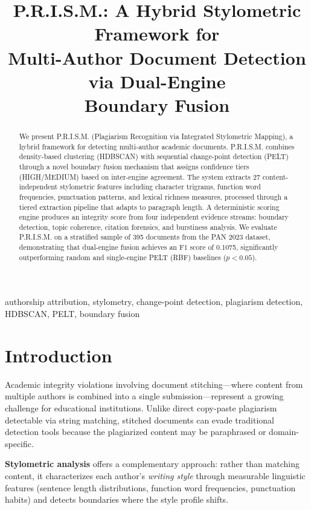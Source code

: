 \documentclass[conference]{IEEEtran}
\title{P.R.I.S.M.: A Hybrid Stylometric Framework for\\Multi-Author Document Detection via Dual-Engine\\Boundary Fusion}
\author{
    \IEEEauthorblockN{Harshal Andhale}
    \IEEEauthorblockA{Department of Computer Science\\
    \textit{Affiliation}\\
    harshal@example.com}
}
\begin{document}
\maketitle

\begin{abstract}
We present P.R.I.S.M. (Plagiarism Recognition via Integrated Stylometric Mapping), a hybrid framework for detecting multi-author academic documents. P.R.I.S.M. combines density-based clustering (HDBSCAN) with sequential change-point detection (PELT) through a novel boundary fusion mechanism that assigns confidence tiers (HIGH/MEDIUM) based on inter-engine agreement. The system extracts 27 content-independent stylometric features including character trigrams, function word frequencies, punctuation patterns, and lexical richness measures, processed through a tiered extraction pipeline that adapts to paragraph length. A deterministic scoring engine produces an integrity score from four independent evidence streams: boundary detection, topic coherence, citation forensics, and burstiness analysis. We evaluate P.R.I.S.M. on a stratified sample of 395 documents from the PAN 2023 dataset, demonstrating that dual-engine fusion achieves an F1 score of 0.1075, significantly outperforming random and single-engine PELT (RBF) baselines ($p < 0.05$).
\end{abstract}

\begin{IEEEkeywords}
authorship attribution, stylometry, change-point detection, plagiarism detection, HDBSCAN, PELT, boundary fusion
\end{IEEEkeywords}

\section{Introduction}
\label{sec:intro}

Academic integrity violations involving document stitching---where content from multiple authors is combined into a single submission---represent a growing challenge for educational institutions. Unlike direct copy-paste plagiarism detectable via string matching, stitched documents can evade traditional detection tools because the plagiarized content may be paraphrased or domain-specific.

\textbf{Stylometric analysis} offers a complementary approach: rather than matching content, it characterizes each author's \textit{writing style} through measurable linguistic features (sentence length distributions, function word frequencies, punctuation habits) and detects boundaries where the style profile shifts.
\end{document}
